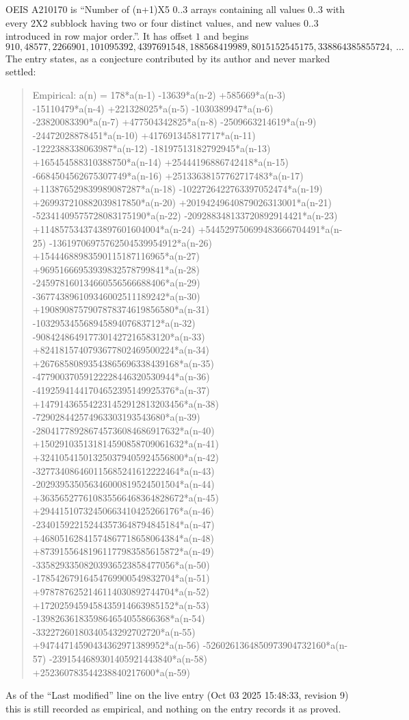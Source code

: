 \documentclass[11pt,a4paper]{article}
\theoremstyle{plain}
\theoremstyle{definition}
\begin{document}
OEIS A210170 is ``Number of (n+1)X5 0..3 arrays containing all values 0..3 with every 2X2 subblock having two or four distinct values, and new values 0..3 introduced in row major order.''. It has offset $1$ and begins
\[
910, 48577, 2266901, 101095392, 4397691548, 188568419989, 8015152545175, 338864385855724,\ \dots
\]
The entry states, as a conjecture contributed by its author and never marked settled:
\begin{quote}
Empirical: a(n) = 178*a(n-1) -13639*a(n-2) +585669*a(n-3) -15110479*a(n-4) +221328025*a(n-5) -1030389947*a(n-6) -23820083390*a(n-7) +477504342825*a(n-8) -2509663214619*a(n-9) -24472028878451*a(n-10) +417691345817717*a(n-11) -1222388338063987*a(n-12) -18197513182792945*a(n-13) +165454588310388750*a(n-14) +25444196886742418*a(n-15) -6684504562675307749*a(n-16) +25133638157762717483*a(n-17) +113876529839989087287*a(n-18) -1022726422763397052474*a(n-19) +269937210882039817850*a(n-20) +20194249640879026313001*a(n-21) -52341409575728083175190*a(n-22) -209288348133720892914421*a(n-23) +1148575343743897601604004*a(n-24) +544529750699483666704491*a(n-25) -13619706975762504539954912*a(n-26) +15444688983590115187116965*a(n-27) +96951666953939832578799841*a(n-28) -245978160134660556566688406*a(n-29) -367743896109346002511189242*a(n-30) +1908908757907878374619856580*a(n-31) -10329534556894589407683712*a(n-32) -9084248649177301427216583120*a(n-33) +8241815740793677802469500224*a(n-34) +26768580893543865696338439168*a(n-35) -47790037059122228446320530944*a(n-36) -41925941441704652395149925376*a(n-37) +147914365542231452912813203456*a(n-38) -729028442574963303193543680*a(n-39) -280417789286745736084686917632*a(n-40) +150291035131814590858709061632*a(n-41) +324105415013250379405924556800*a(n-42) -327734086460115685241612222464*a(n-43) -202939535056346000819524501504*a(n-44) +363565277610835566468364828672*a(n-45) +29441510732450663410425266176*a(n-46) -234015922152443573648794845184*a(n-47) +46805162841574867718658064384*a(n-48) +87391556481961177983585615872*a(n-49) -33582933508203936523858477056*a(n-50) -17854267916454769900549832704*a(n-51) +9787876252146114030892744704*a(n-52) +1720259459458435914663985152*a(n-53) -1398263618359864654055866368*a(n-54) -33227260180340543292702720*a(n-55) +94744714590434362971389952*a(n-56) -5260261364850973904732160*a(n-57) -2391544689301405921443840*a(n-58) +252360783544238840217600*a(n-59)
\end{quote}
As of the ``Last modified'' line on the live entry (Oct 03 2025 15:48:33, revision 9) this is still
recorded as empirical, and nothing on the entry records it as proved.
\end{document}
